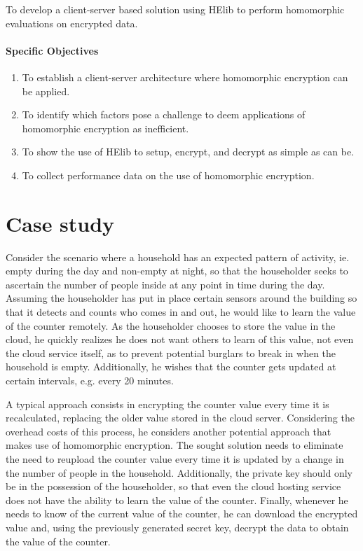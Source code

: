 To develop a client-server based solution using HElib to perform homomorphic evaluations on encrypted data.

\paragraph{Specific Objectives}
\begin{enumerate}
\item To establish a client-server architecture where homomorphic encryption can be applied.
\item To identify which factors pose a challenge to deem applications of homomorphic encryption as inefficient.
\item To show the use of HElib to setup, encrypt, and decrypt as simple as can be.
\item To collect performance data on the use of homomorphic encryption.
\end{enumerate}

\section{Case study}

Consider the scenario where a household has an expected pattern of activity, ie. empty during the day and non-empty at night, so that the householder seeks to ascertain the number of people inside at any point in time during the day. Assuming the householder has put in place certain sensors around the building so that it detects and counts who comes in and out, he would like to learn the value of the counter remotely. As the householder chooses to store the value in the cloud, he quickly realizes he does not want others to learn of this value, not even the cloud service itself, as to prevent potential burglars to break in when the household is empty. Additionally, he wishes that the counter gets updated at certain intervals, e.g. every 20 minutes. 

A typical approach consists in encrypting the counter value every time it is recalculated, replacing the older value stored in the cloud server. Considering the overhead costs of this process, he considers another potential approach that makes use of homomorphic encryption. The sought solution needs to eliminate the need to reupload the counter value every time it is updated by a change in the number of people in the household. Additionally, the private key should only be in the possession of the householder, so that even the cloud hosting service does not have the ability to learn the value of the counter. Finally, whenever he needs to know of the current value of the counter, he can download the encrypted value and, using the previously generated secret key, decrypt the data to obtain the value of the counter.

